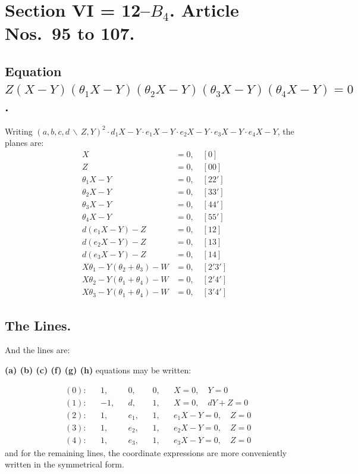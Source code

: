 \documentclass[11pt,a4paper]{article}
\begin{document}
\section*{Section VI = 12--$B_4$. \quad Article Nos.~95 to 107.}

\setcounter{section}{95}
\subsection*{Equation $Z(X-Y)(\theta_1X-Y)(\theta_2X-Y)(\theta_3X-Y)(\theta_4X-Y) = 0$.}

Writing $(a,b,c,d \,\backslash\, Z,Y)^2 \cdot d_1X - Y \cdot e_1X - Y \cdot e_2X - Y \cdot e_3X - Y \cdot e_4X - Y$, the planes are:
\begin{align*}
X &= 0, \quad [0] \\
Z &= 0, \quad [00] \\
\theta_1X - Y &= 0, \quad [22'] \\
\theta_2X - Y &= 0, \quad [33'] \\
\theta_3X - Y &= 0, \quad [44'] \\
\theta_4X - Y &= 0, \quad [55'] \\
d(e_1X - Y) - Z &= 0, \quad [12] \\
d(e_2X - Y) - Z &= 0, \quad [13] \\
d(e_3X - Y) - Z &= 0, \quad [14] \\
X\theta_1 - Y(\theta_2 + \theta_3) - W &= 0, \quad [2'3'] \\
X\theta_2 - Y(\theta_1 + \theta_4) - W &= 0, \quad [2'4'] \\
X\theta_3 - Y(\theta_1 + \theta_4) - W &= 0, \quad [3'4']
\end{align*}

\subsection*{The Lines.}

And the lines are:

\begin{center}
\textbf{(a) (b) (c) (f) (g) (h)} equations may be written:
\end{center}
\begin{align*}
&(0): && 1, && 0, && 0, && X = 0, \quad Y = 0 \\
&(1): && -1, && d, && 1, && X = 0, \quad dY + Z = 0 \\
&(2): && 1, && e_1, && 1, && e_1X - Y = 0, \quad Z = 0 \\
&(3): && 1, && e_2, && 1, && e_2X - Y = 0, \quad Z = 0 \\
&(4): && 1, && e_3, && 1, && e_3X - Y = 0, \quad Z = 0
\end{align*}
and for the remaining lines, the coordinate expressions are more conveniently written in the symmetrical form.
\end{document}
